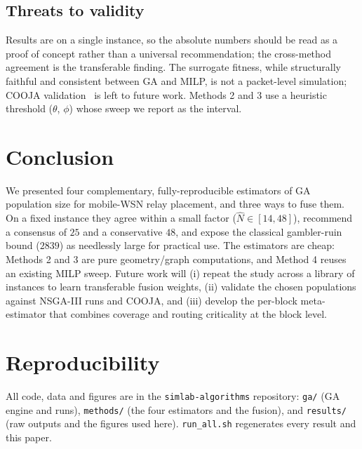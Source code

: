 \documentclass[conference]{IEEEtran}
\newcommand{\Nhat}{\hat{N}}
\begin{document}
\subsection{Threats to validity}
Results are on a single instance, so the absolute numbers should be read as a
proof of concept rather than a universal recommendation; the cross-method
agreement is the transferable finding. The surrogate fitness, while structurally
faithful and consistent between GA and MILP, is not a packet-level simulation;
COOJA validation~\cite{osterlind2006cooja} is left to future work. Methods 2 and
3 use a heuristic threshold ($\theta$, $\phi$) whose sweep we report as the
interval.

\section{Conclusion}
\label{sec:conclusion}
We presented four complementary, fully-reproducible estimators of GA population
size for mobile-WSN relay placement, and three ways to fuse them. On a fixed
instance they agree within a small factor ($\Nhat\in[14,48]$), recommend a
consensus of $25$ and a conservative $48$, and expose the classical gambler-ruin
bound ($2839$) as needlessly large for practical use. The estimators are cheap:
Methods 2 and 3 are pure geometry/graph computations, and Method 4 reuses an
existing MILP sweep. Future work will (i) repeat the study across a library of
instances to learn transferable fusion weights, (ii) validate the chosen
populations against NSGA-III runs and COOJA, and (iii) develop the per-block
meta-estimator that combines coverage and routing criticality at the block
level.

\section*{Reproducibility}
All code, data and figures are in the \texttt{simlab-algorithms} repository:
\texttt{ga/} (GA engine and runs), \texttt{methods/} (the four estimators and the
fusion), and \texttt{results/} (raw outputs and the figures used here).
\texttt{run\_all.sh} regenerates every result and this paper.



\end{document}
